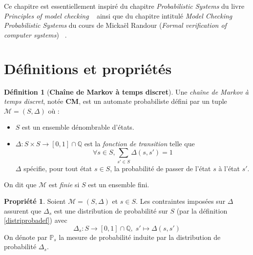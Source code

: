 \documentclass[12pt,a4paper]{report}
\theoremstyle{definition}%
\newtheorem{definition}{Définition}[chapter]
\newtheorem{propriete}{Propriété}[chapter]
\theoremstyle{remark}
\newcommand{\pr}{\mathbb{P}}
\let\labelitemi\labelitemii
\begin{document}
Ce chapitre est essentiellement inspiré du chapitre \textit{Probabilistic Systems} du livre \textit{Principles of model checking} ~\cite{DBLP:books/daglib/0020348} ainsi que du chapitre intitulé \textit{Model Checking Probabilistic Systems} du cours de Mickaël Randour (\textit{Formal verification of computer systems}) ~\cite{Course1}.

\section{Définitions et propriétés}

\theoremstyle{definition}
\begin{definition}[\textbf{Chaîne de Markov à temps discret}]

	Une \textit{chaîne de Markov à temps discret}, notée \textbf{CM}, est un automate probabiliste défini par un tuple  $\mathcal{M} = (S, \Delta)$ où :
	\begin{itemize}
		\renewcommand{\labelitemi}{\tiny$\bullet$}
		\item $S$ est un ensemble dénombrable d'états.
		\item $\Delta: S \times S \rightarrow [0,1] \cap \mathbb{Q}$ est la \textit{fonction de transition} telle que \[\forall s \in S, \sum_{s' \in S}\Delta(s, s')= 1\]
		$\Delta$ spécifie, pour tout état $s \in S$, la probabilité de passer de l'état $s$ à l'état $s'$.
	\end{itemize}
	On dit que $\mathcal{M}$ est \textit{finie} si $S$ est un ensemble fini.
\end{definition}

\begin{propriete} \label{distribmarkov}
	Soient $\mathcal{M} = (S, \Delta)$ et $s \in S$.
	Les contraintes imposées sur $\Delta$ assurent que $\Delta_s$ est une distribution de probabilité sur $S$  (par la définition \ref{distriprobadef}) avec \[\Delta_s : S \rightarrow [0, 1] \cap \mathbb{Q}, \; s' \mapsto \Delta(s, s')\] On dénote par $\pr_s$ la mesure de probabilité induite par la distribution de probabilité $\Delta_s$.%
\end{propriete}
\end{document}
